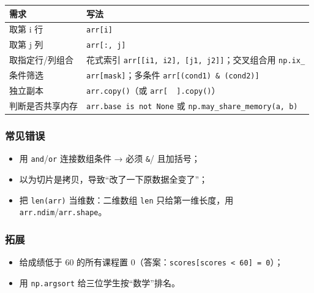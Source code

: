 {\def\LTcaptype{none} %
\begin{longtable}[]{@{}
  >{\raggedright\arraybackslash}p{}
  >{\raggedright\arraybackslash}p{}@{}}
\toprule\noalign{}
\begin{minipage}[b]{\linewidth}\raggedright
需求
\end{minipage} & \begin{minipage}[b]{\linewidth}\raggedright
写法
\end{minipage} \\
\midrule\noalign{}
\endhead
\bottomrule\noalign{}
\endlastfoot
取第 i 行 & \texttt{arr{[}i{]}} \\
取第 j 列 & \texttt{arr{[}:,\ j{]}} \\
取指定行/列组合 & 花式索引
\texttt{arr{[}{[}i1,\ i2{]},\ {[}j1,\ j2{]}{]}}；交叉组合用
\texttt{np.ix\_} \\
条件筛选 & \texttt{arr{[}mask{]}}；多条件
\texttt{arr{[}(cond1)\ \&\ (cond2){]}} \\
独立副本 & \texttt{arr.copy()}（或 \texttt{arr{[}\ \ {]}.copy()}） \\
判断是否共享内存 & \texttt{arr.base\ is\ not\ None} 或
\texttt{np.may\_share\_memory(a,\ b)} \\
\end{longtable}
}

\subsubsection{常见错误}\label{ux5e38ux89c1ux9519ux8bef}

\begin{itemize}
\tightlist
\item
  用 \texttt{and}/\texttt{or} 连接数组条件 → 必须
  \texttt{\&}/\texttt{\textbar{}} 且加括号；
\item
  以为切片是拷贝，导致``改了一下原数据全变了''；
\item
  把 \texttt{len(arr)} 当维数：二维数组 \texttt{len} 只给第一维长度，用
  \texttt{arr.ndim}/\texttt{arr.shape}。
\end{itemize}

\subsubsection{拓展}\label{ux62d3ux5c55}

\begin{itemize}
\tightlist
\item
  给成绩低于 60 的所有课程置
  0（答案：\texttt{scores{[}scores\ \textless{}\ 60{]}\ =\ 0}）；
\item
  用 \texttt{np.argsort} 给三位学生按``数学''排名。
\end{itemize}

